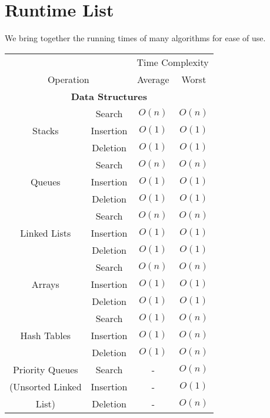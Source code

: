 \section{Runtime List}

We bring together the running times of many algorithms for ease of use.

\begin{center}
    \begin{tabular}{| c | c | c | c |}
        \hline
        \multicolumn{2}{|c|}{}          & \multicolumn{2}{c|}{Time Complexity} \\
        \cline{3-4}
        \multicolumn{2}{|c|}{Operation} & Average & Worst                      \\
        \hline \hline
        \multicolumn{4}{|c|}{\textbf{Data Structures}} \\
        \hline \hline
        \multirow{3}{*}{Stacks} 
        & Search    & $O(n)$ & $O(n)$ \\
        & Insertion & $O(1)$ & $O(1)$ \\
        & Deletion  & $O(1)$ & $O(1)$ \\
        \hline \hline
        \multirow{3}{*}{Queues} 
        & Search    & $O(n)$ & $O(n)$ \\
        & Insertion & $O(1)$ & $O(1)$ \\
        & Deletion  & $O(1)$ & $O(1)$ \\
        \hline \hline
        \multirow{3}{*}{Linked Lists} 
        & Search    & $O(n)$ & $O(n)$ \\
        & Insertion & $O(1)$ & $O(1)$ \\
        & Deletion  & $O(1)$ & $O(1)$ \\
        \hline \hline
        \multirow{3}{*}{Arrays} 
        & Search    & $O(n)$ & $O(n)$ \\
        & Insertion & $O(1)$ & $O(1)$ \\
        & Deletion  & $O(1)$ & $O(1)$ \\
        \hline \hline
        \multirow{3}{*}{Hash Tables} 
        & Search    & $O(1)$ & $O(n)$ \\
        & Insertion & $O(1)$ & $O(n)$ \\
        & Deletion  & $O(1)$ & $O(n)$ \\
        \hline \hline
        Priority Queues  & Search    & - & $O(n)$ \\
        (Unsorted Linked & Insertion & - & $O(1)$ \\
        List)            & Deletion  & - & $O(n)$ \\

\end{tabular}
\end{center}
